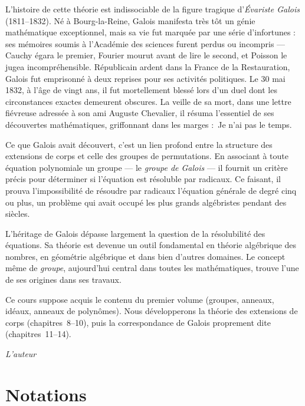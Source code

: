 \documentclass[12pt,a4paper,openany]{book}
\theoremstyle{definition}
\providecommand{\og}{\guillemotleft\,}
\providecommand{\fg}{\,\guillemotright}
\begin{document}
L'histoire de cette théorie est indissociable de la figure tragique d'\emph{Évariste
Galois} (1811--1832). Né à Bourg-la-Reine, Galois
manifesta très tôt un génie mathématique exceptionnel, mais sa vie fut marquée
par une série d'infortunes : ses mémoires soumis à l'Académie des sciences furent
perdus ou incompris --- Cauchy égara le premier, Fourier mourut avant de lire le
second, et Poisson le jugea incompréhensible. Républicain ardent dans la France
de la Restauration, Galois fut emprisonné à deux reprises pour ses activités
politiques. Le 30 mai 1832, à l'âge de vingt ans, il fut mortellement blessé lors
d'un duel dont les circonstances exactes demeurent obscures. La veille de sa mort,
dans une lettre fiévreuse adressée à son ami Auguste Chevalier, il résuma
l'essentiel de ses découvertes mathématiques, griffonnant dans les marges :
\og{}Je n'ai pas le temps.\fg{}

Ce que Galois avait découvert, c'est un lien profond entre la structure des
extensions de corps et celle des groupes de permutations. En associant à toute
équation polynomiale un groupe --- le \emph{groupe de Galois} --- il fournit un critère précis pour déterminer si l'équation est
résoluble par radicaux. Ce faisant, il prouva l'impossibilité de résoudre par
radicaux l'équation générale de degré cinq ou plus, un problème qui avait occupé
les plus grands algébristes pendant des siècles.

L'héritage de Galois dépasse largement la question de la résolubilité des
équations. Sa théorie est devenue un outil fondamental en théorie algébrique des
nombres, en géométrie algébrique et dans bien d'autres domaines. Le concept même
de \emph{groupe}, aujourd'hui central dans toutes les mathématiques, trouve l'une
de ses origines dans ses travaux.

Ce cours suppose acquis le contenu du premier volume (groupes, anneaux, idéaux,
anneaux de polynômes). Nous développerons la théorie des extensions de corps
(chapitres~8--10), puis la correspondance de Galois proprement dite
(chapitres~11--14).

\bigskip
\hfill\emph{L'auteur}

\chapter*{Notations}
\end{document}
